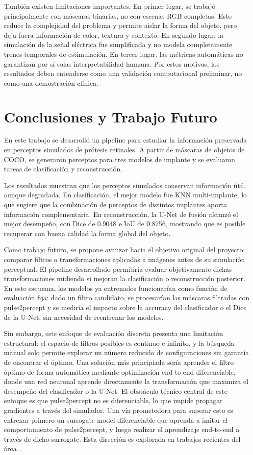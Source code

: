 \documentclass[conference,a4paper]{IEEEtran}
\begin{document}
También existen limitaciones importantes. En primer lugar, se trabajó principalmente con máscaras binarias, no con escenas RGB completas. Esto reduce la complejidad del problema y permite aislar la forma del objeto, pero deja fuera información de color, textura y contexto. En segundo lugar, la simulación de la señal eléctrica fue simplificada y no modela completamente trenes temporales de estimulación. En tercer lugar, las métricas automáticas no garantizan por sí solas interpretabilidad humana. Por estos motivos, los resultados deben entenderse como una validación computacional preliminar, no como una demostración clínica.

\section{Conclusiones y Trabajo Futuro}

En este trabajo se desarrolló un pipeline para estudiar la información preservada en perceptos simulados de prótesis retinales. A partir de máscaras de objetos de COCO, se generaron perceptos para tres modelos de implante y se evaluaron tareas de clasificación y reconstrucción.

Los resultados muestran que los perceptos simulados conservan información útil, aunque degradada. En clasificación, el mejor modelo fue KNN multi-implante, lo que sugiere que la combinación de perceptos de distintos implantes aporta información complementaria. En reconstrucción, la U-Net de fusión alcanzó el mejor desempeño, con Dice de 0.9048 e IoU de 0.8756, mostrando que es posible recuperar con buena calidad la forma global del objeto.

Como trabajo futuro, se propone avanzar hacia el objetivo original del proyecto: comparar filtros o transformaciones aplicadas a imágenes antes de su simulación perceptual. El pipeline desarrollado permitiría evaluar objetivamente dichas transformaciones midiendo si mejoran la clasificación o reconstrucción posterior. En este esquema, los modelos ya entrenados funcionarían como función de evaluación fija: dado un filtro candidato, se procesarían las máscaras filtradas con pulse2percept y se mediría el impacto sobre la accuracy del clasificador o el Dice de la U-Net, sin necesidad de reentrenar los modelos.

Sin embargo, este enfoque de evaluación discreta presenta una limitación estructural: el espacio de filtros posibles es continuo e infinito, y la búsqueda manual solo permite explorar un número reducido de configuraciones sin garantía de encontrar el óptimo. Una solución más principiada sería aprender el filtro óptimo de forma automática mediante optimización end-to-end diferenciable, donde una red neuronal aprende directamente la transformación que maximiza el desempeño del clasificador o la U-Net. El obstáculo técnico central de este enfoque es que pulse2percept no es diferenciable, lo que impide propagar gradientes a través del simulador. Una vía prometedora para superar esto es entrenar primero un surrogate model diferenciable que aprenda a imitar el comportamiento de pulse2percept, y luego realizar el aprendizaje end-to-end a través de dicho surrogate. Esta dirección es explorada en trabajos recientes del área~\cite{granley2022}.
\end{document}
